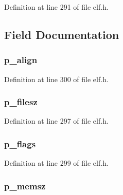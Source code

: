 Definition at line 291 of file elf.\-h.



\subsection{Field Documentation}
\hypertarget{struct_elf32___phdr_a66609694ebd2c2235315b7a25b2bae63}{
\subsubsection[{p\-\_\-align}]{ p\-\_\-align}}\label{struct_elf32___phdr_a66609694ebd2c2235315b7a25b2bae63}


Definition at line 300 of file elf.\-h.

\hypertarget{struct_elf32___phdr_a3b607fe05ae8ac5dbe7b328eb25b9c11}{
\subsubsection[{p\-\_\-filesz}]{ p\-\_\-filesz}}\label{struct_elf32___phdr_a3b607fe05ae8ac5dbe7b328eb25b9c11}


Definition at line 297 of file elf.\-h.

\hypertarget{struct_elf32___phdr_a39014f5cea369c520082e26e9518a697}{
\subsubsection[{p\-\_\-flags}]{ p\-\_\-flags}}\label{struct_elf32___phdr_a39014f5cea369c520082e26e9518a697}


Definition at line 299 of file elf.\-h.

\hypertarget{struct_elf32___phdr_a927f5fb1182d6e414c7ac3573aed393f}{
\subsubsection[{p\-\_\-memsz}]{ p\-\_\-memsz}}\label{struct_elf32___phdr_a927f5fb1182d6e414c7ac3573aed393f}


